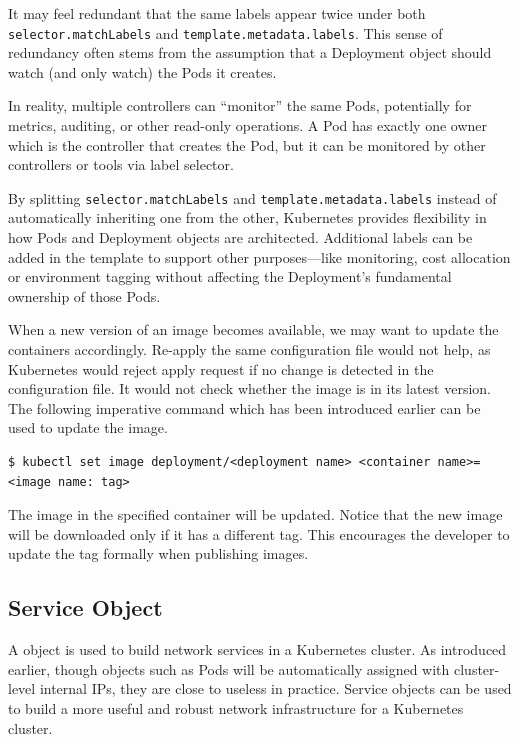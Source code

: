 \begin{shortbox}

It may feel redundant that the same labels appear twice under both \texttt{selector.matchLabels} and \texttt{template.metadata.labels}. This sense of redundancy often stems from the assumption that a Deployment object should watch (and only watch) the Pods it creates.

In reality, multiple controllers can ``monitor'' the same Pods, potentially for metrics, auditing, or other read-only operations. A Pod has exactly one owner which is the controller that creates the Pod, but it can be monitored by other controllers or tools via label selector.

By splitting \texttt{selector.matchLabels} and \texttt{template.metadata.labels} instead of automatically inheriting one from the other, Kubernetes provides flexibility in how Pods and Deployment objects are architected. Additional labels can be added in the template to support other purposes—like monitoring, cost allocation or environment tagging without affecting the Deployment’s fundamental ownership of those Pods.

\end{shortbox}

When a new version of an image becomes available, we may want to update the containers accordingly. Re-apply the same configuration file would not help, as Kubernetes would reject apply request if no change is detected in the configuration file. It would not check whether the image is in its latest version. The following imperative command which has been introduced earlier can be used to update the image.
\begin{lstlisting}
$ kubectl set image deployment/<deployment name> <container name>=<image name: tag>
\end{lstlisting}
The image in the specified container will be updated. Notice that the new image will be downloaded only if it has a different tag. This encourages the developer to update the tag formally when publishing images.

\subsection{Service Object} \label{ch:vac:subsec:k8snetworking}

A  object is used to build network services in a Kubernetes cluster. As introduced earlier, though objects such as Pods will be automatically assigned with cluster-level internal IPs, they are close to useless in practice. Service objects can be used to build a more useful and robust network infrastructure for a Kubernetes cluster.

